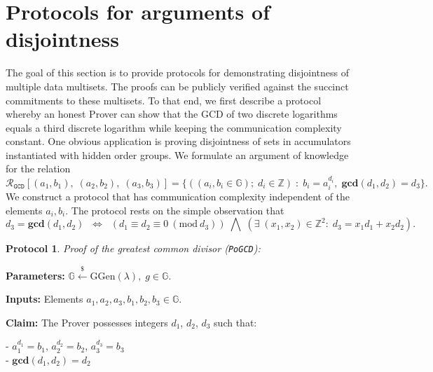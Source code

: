 \documentclass[11pt, lettersize, notitlepage, leqno, footskip=0.6cm]{article}
\newcommand{\bz}{\mathbb Z}
\newcommand{\ttt}{\texttt}
\newcommand{\LRA}{\Longleftrightarrow}
\newcommand{\mc}{\mathcal}
\newcommand{\mb}{\mathbb}
\newcommand{\mbf}{\mathbf}
\newcommand{\mr}{\mathrm}
\newcommand{\lamb}{\lambda}
\newcommand{\vs}{\vspace{-0.15cm}}
\newcommand{\Mod}[1]{\ (\mathrm{mod}\ #1)}
\newcommand{\GCD}{\mbf{gcd}}
\newtheorem{Prot}[Thm]{Protocol}
\numberwithin{equation}{section}
\begin{document}
\section{\fontsize{12}{12}\selectfont Protocols for arguments of disjointness}

The goal of this section is to provide protocols for demonstrating disjointness of multiple data multisets. The proofs can be publicly verified against the succinct commitments to these multisets. To that end, we first describe a protocol whereby an honest Prover can show that the GCD of two discrete logarithms equals a third discrete logarithm while keeping the communication complexity constant. One obvious application is proving disjointness of sets in accumulators instantiated with hidden order groups. We formulate an argument of knowledge for the relation \vs  $$\mc{R}_{{\ttt{GCD}}}[(a_1,b_1),\;(a_2,b_2),\;(a_3,b_3)] = \{((a_i, b_i\in\mb{G});\;d_i\in\bz)\;:\; b_i = a_i^{d_i},\;\GCD(d_1,d_2)=d_3  \} .$$ We construct a protocol that has communication complexity independent of the elements $a_i, b_i$. The protocol rests on the simple observation that \vs $$d_3 = \GCD(d_1, d_2)\;\; \LRA \;\;(d_1\equiv d_2\equiv 0 \Mod{d_3})\;\bigwedge \; \left(\exists \; (x_1,x_2)\in \bz^2:\; d_3 = x_1d_1+x_2d_2  \right).$$
 

\begin{Prot} \normalfont \textit{Proof of the greatest common divisor} (\verb|PoGCD|):\end{Prot} \vspace{-0.3cm}

\noindent \textbf{Parameters:} $\mb{G}\xleftarrow{\$} \mr{GGen}(\lamb), \; g\in \mb{G}$.

\noindent \textbf{Inputs:} Elements $a_1, a_2, a_3, b_1, b_2, b_3 \in \mb{G}$.

\noindent \textbf{Claim:} The Prover possesses integers $d_1$, $d_2$, $d_3$ such that:

\noindent - $a_1^{d_1} = b_1$, $a_2^{d_2} = b_2$, $a_3^{d_3} = b_3$\\
\noindent - $\GCD(d_1, d_2) = d_2$
 
\end{document}

